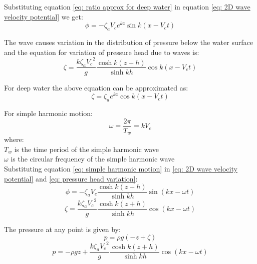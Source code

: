 Substituting equation \ref{eq: ratio approx for deep water} in equation 
\ref{eq: 2D wave velocity potential} we get:
\begin{equation}
  \phi = - \zeta_a V_c e^{k z} \sin k(x - V_c t)
  \label{eq: 2D wave velocity potential for deep water}
\end{equation}

The wave causes variation in the distribution of pressure below the water
surface and the equation for variation of pressure head due to waves is:
\begin{equation}
  \zeta = \frac{k \zeta_a {V_c}^2}{g} \frac{\cosh k(z + h)}{\sinh kh} \cos k(x
  - V_c t)
  \label{eq: pressure head variation}
\end{equation}

For deep water the above equation can be approximated as:
\begin{equation}
  \zeta = \zeta_a e^{k z} \cos k(x - V_c t)
  \label{eq: pressure head variation for deep water}
\end{equation}

For simple harmonic motion: 
\begin{equation}
  \omega = \frac{2 \pi}{T_w} = k V_c
  \label{eq: simple harmonic motion}
\end{equation}
where: \\
$T_w$ is the time period of the simple harmonic wave\\
$\omega$ is the circular frequency of the simple harmonic wave\\

Substituting equation \ref{eq: simple harmonic motion} in 
\ref{eq: 2D wave velocity potential} and 
\ref{eq: pressure head variation}:
\begin{equation}
  \phi = - \zeta_a V_c \frac{\cosh k(z+h)}{\sinh kh} \sin (kx - \omega t)
  \label {eq: 2D wave velocity potential wrt frequency}
\end{equation}
\begin{equation}
  \zeta = \frac{k \zeta_a {V_c}^2}{g} \frac{\cosh k(z + h)}{\sinh kh} \cos (kx
  - \omega t)
  \label{eq: pressure head variation wrt frequency}
\end{equation}

The pressure at any point is given by:
\begin{equation}
  p = \rho g (-z + \zeta)
\end{equation}
\begin{equation}
  p = - \rho g z + \frac{k \zeta_a {V_c}^2}{g} \frac{\cosh k(z + h)}{\sinh kh} 
  \cos (kx - \omega t)
  \label{eq: pressure variation}
\end{equation}

